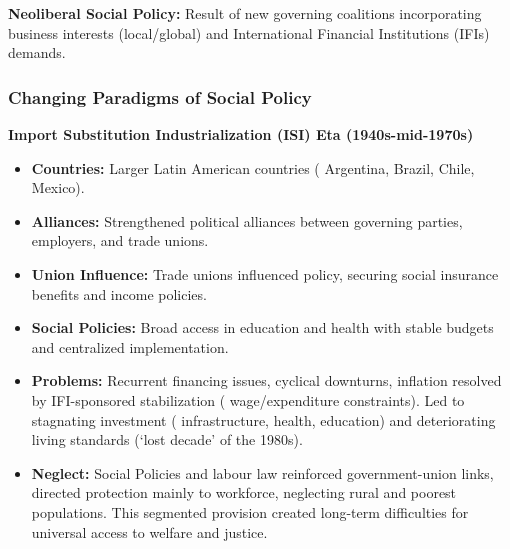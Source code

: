 \documentclass{article}
\begin{document}
    \noindent \textbf{Neoliberal Social Policy:} Result of new governing
coalitions incorporating business interests (local/global) and International
Financial Institutions (IFIs) demands.

    \subsubsection{Changing Paradigms of Social Policy}

    \noindent
\textbf{Import Substitution Industrialization (ISI) Eta (1940s-mid-1970s)}
    \begin{itemize}
        \item \textbf{Countries:} Larger Latin American countries (
        Argentina, Brazil, Chile, Mexico).
        \item \textbf{Alliances:} Strengthened political alliances between
        governing parties, employers, and trade unions.
        \item \textbf{Union Influence:} Trade unions influenced policy,
        securing social insurance benefits and income policies.
        \item \textbf{Social Policies:} Broad access in education and
        health with stable budgets and centralized implementation.
        \item \textbf{Problems:} Recurrent financing issues, cyclical
        downturns, inflation resolved by IFI-sponsored stabilization (
        wage/expenditure constraints). Led to stagnating investment (
        infrastructure, health, education) and deteriorating living
        standards (`lost decade' of the 1980s).
        \item \textbf{Neglect:} Social Policies and labour law reinforced
        government-union links, directed protection mainly to workforce,
        neglecting rural and poorest populations. This segmented provision
        created long-term difficulties for universal access to welfare and
        justice.
    \end{itemize}
\end{document}

